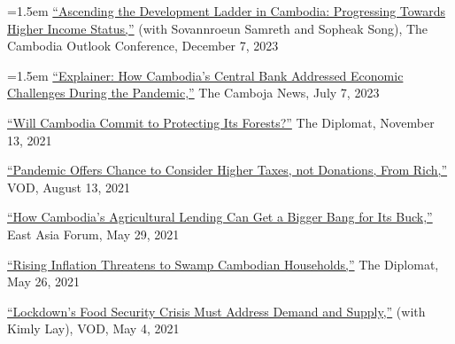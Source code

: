 \documentclass[10pt,a4paper]{article}
\begin{document}
	\hangindent=1.5em
	\href{https://coc2023.cdri.org.kh/ascending-the-development-ladder-in-cambodia-progressing-towards-higher-income-status/}{``Ascending the Development Ladder in Cambodia: Progressing Towards Higher Income Status,''} (with Sovannroeun Samreth and Sopheak Song), The Cambodia Outlook Conference, December 7, 2023\\ \vspace{-.5em}
	
	\hangindent=1.5em
	\href{https://cambojanews.com/explainer-how-cambodias-central-bank-addressed-economic-challenges-during-the-pandemic/}{``Explainer: How Cambodia's Central Bank Addressed Economic Challenges During the Pandemic,''} The Camboja News, July 7, 2023\\ \vspace{-.5em}
	
	\href{https://thediplomat.com/2021/11/will-cambodia-commit-to-protecting-its-forests/}{``Will Cambodia Commit to Protecting Its Forests?''} The Diplomat, November 13, 2021\\ \vspace{-.5em}

	\href{https://vodenglish.news/opinion-pandemic-offers-chance-to-consider-higher-taxes-not-donations-from-rich/}{``Pandemic Offers Chance to Consider Higher Taxes, not Donations, From Rich,''} VOD, August 13, 2021\\ \vspace{-.5em}

	\href{https://www.eastasiaforum.org/2021/05/29/how-cambodias-agricultural-lending-can-get-a-bigger-bang-for-its-buck/}{``How Cambodia's Agricultural Lending Can Get a Bigger Bang for Its Buck,''} East Asia Forum, May 29, 2021\\ \vspace{-.5em}

	\href{https://thediplomat.com/2021/05/rising-inflation-threatens-to-swamp-cambodian-households/}{``Rising Inflation Threatens to Swamp Cambodian Households,''} The Diplomat, May 26, 2021\\ \vspace{-.5em}

	\href{https://vodenglish.news/opinion-lockdowns-food-security-crisis-must-address-demand-and-supply/}{``Lockdown's Food Security Crisis Must Address Demand and Supply,''} (with Kimly Lay), VOD, May 4, 2021\\ \vspace{-.5em}
\end{document}
